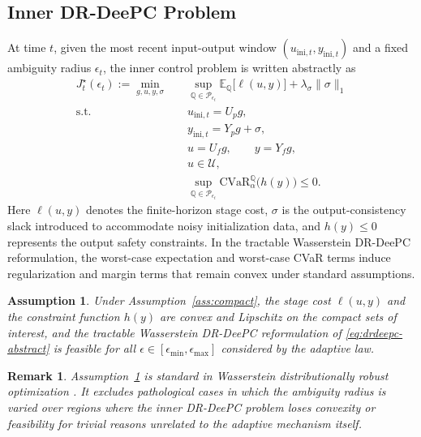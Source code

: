 \documentclass[conference]{IEEEtran}
\newtheorem{assumption}{Assumption}
\newtheorem{remark}{Remark}
\begin{document}
\subsection{Inner DR-DeePC Problem}
At time $t$, given the most recent input-output window $(u_{\mathrm{ini},t},y_{\mathrm{ini},t})$ and a fixed ambiguity radius $\epsilon_t$, the inner control problem is written abstractly as
\begin{subequations}
\label{eq:drdeepc-abstract}
\begin{align}
J_t^\star(\epsilon_t)
:=
\min_{g,u,y,\sigma}\quad
& \sup_{\mathbb{Q}\in\mathcal{P}_{\epsilon_t}}
\mathbb{E}_{\mathbb{Q}} \big[ \ell(u,y) \big]
 + \lambda_{\sigma}\|\sigma\|_1
\label{eq:drdeepc-abstract-cost}
\\
\text{s.t.}\quad
& u_{\mathrm{ini},t} = U_p g,
\\
& y_{\mathrm{ini},t} = Y_p g + \sigma,
\\
& u = U_f g,\qquad y = Y_f g,
\\
& u \in \mathcal{U}, 
\\
& \sup_{\mathbb{Q}\in\mathcal{P}_{\epsilon_t}}
\mathrm{CVaR}_{\alpha}^{\mathbb{Q}}\!\big(h(y)\big) \le 0.
\label{eq:drdeepc-abstract-risk}
\end{align}
\end{subequations}
Here $\ell(u,y)$ denotes the finite-horizon stage cost, $\sigma$ is the output-consistency slack introduced to accommodate noisy initialization data, and $h(y)\le 0$ represents the output safety constraints. In the tractable Wasserstein DR-DeePC reformulation, the worst-case expectation and worst-case CVaR terms induce regularization and margin terms that remain convex under standard assumptions.

\begin{assumption}
\label{ass:lipschitz}
Under Assumption~\ref{ass:compact}, the stage cost $\ell(u,y)$ and the constraint function $h(y)$ are convex and Lipschitz on the compact sets of interest, and the tractable Wasserstein DR-DeePC reformulation of \eqref{eq:drdeepc-abstract} is feasible for all $\epsilon \in [\epsilon_{\min},\epsilon_{\max}]$ considered by the adaptive law.
\end{assumption}

\begin{remark}
Assumption~\ref{ass:lipschitz} is standard in Wasserstein distributionally robust optimization \cite{EsfahaniKuhn2018}. It excludes pathological cases in which the ambiguity radius is varied over regions where the inner DR-DeePC problem loses convexity or feasibility for trivial reasons unrelated to the adaptive mechanism itself.
\end{remark}
\end{document}

